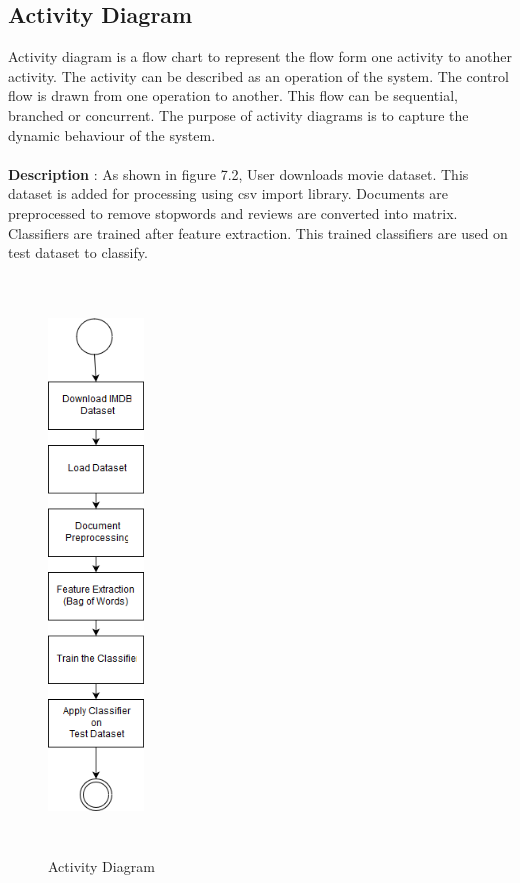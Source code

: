 \documentclass[oneside,a4paper,12pt]{pictreport}
\begin{document}
\subsection{Activity Diagram}
Activity diagram is a flow chart to represent the flow form one activity to another activity. The activity can be described as an operation of the system. The control flow is drawn from one operation to another. This flow can be sequential, branched or concurrent. The purpose of activity diagrams is to capture the dynamic behaviour of the system.\\\\
\textbf{Description} : As shown in figure 7.2, User downloads movie dataset. This dataset is added for processing using csv import 
library. Documents are preprocessed to remove stopwords and reviews are converted into matrix. Classifiers are trained after feature extraction. This trained classifiers are used on test dataset to classify.
\begin{figure}[h!]
\begin{center}
 

\includegraphics[width=1.0in,height=6.0in]{Activity.png}
\caption{Activity Diagram}
\end{center}

\end{figure}
\newpage
\end{document}
